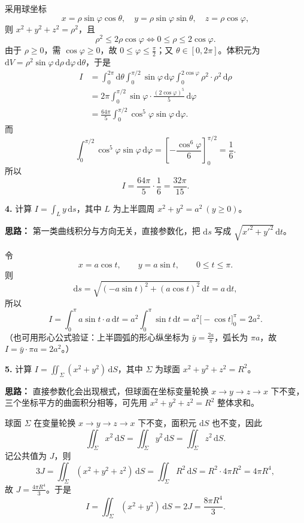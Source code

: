 采用球坐标
\[
x=\rho\sin\varphi\cos\theta,\quad
y=\rho\sin\varphi\sin\theta,\quad
z=\rho\cos\varphi,
\]
则 $x^2+y^2+z^2=\rho^2$，且
\[
\rho^2\le 2\rho\cos\varphi
\iff 0\le\rho\le 2\cos\varphi.
\]
由于 $\rho\ge0$，需 $\cos\varphi\ge0$，故 $0\le\varphi\le\frac{\pi}{2}$；又 $\theta\in[0,2\pi]$。体积元为 $\mathrm{d}V=\rho^2\sin\varphi\,\mathrm{d}\rho\,\mathrm{d}\varphi\,\mathrm{d}\theta$，于是
\[
\begin{aligned}
I
&=\int_0^{2\pi}\mathrm{d}\theta\int_0^{\pi/2}\sin\varphi\,\mathrm{d}\varphi
\int_0^{2\cos\varphi}\rho^2\cdot\rho^2\,\mathrm{d}\rho\\
&=2\pi\int_0^{\pi/2}\sin\varphi\cdot
\frac{(2\cos\varphi)^5}{5}\,\mathrm{d}\varphi\\
&=\frac{64\pi}{5}\int_0^{\pi/2}\cos^5\varphi\sin\varphi\,\mathrm{d}\varphi.
\end{aligned}
\]
而
\[
\int_0^{\pi/2}\cos^5\varphi\sin\varphi\,\mathrm{d}\varphi
=\left[-\frac{\cos^6\varphi}{6}\right]_0^{\pi/2}
=\frac16.
\]
所以
\[
I=\frac{64\pi}{5}\cdot\frac16=\frac{32\pi}{15}.
\]

\else \answerarea[10] \fi%

\textbf{4.} 计算 $\displaystyle I=\int_L y\,\mathrm{d}s$，其中 $L$ 为上半圆周 $x^2+y^2=a^2\ (y\ge0)$。

\ifshowsolutions%
\textbf{思路：} 第一类曲线积分与方向无关，直接参数化，把 $\mathrm{d}s$ 写成 $\sqrt{x'^2+y'^2}\,\mathrm{d}t$。

令
\[
x=a\cos t,\qquad y=a\sin t,\qquad 0\le t\le\pi.
\]
则
\[
\mathrm{d}s=\sqrt{(-a\sin t)^2+(a\cos t)^2}\,\mathrm{d}t=a\,\mathrm{d}t,
\]
所以
\[
I=\int_0^\pi a\sin t\cdot a\,\mathrm{d}t
=a^2\int_0^\pi\sin t\,\mathrm{d}t
=a^2\bigl[-\cos t\bigr]_0^\pi=2a^2.
\]
（也可用形心公式验证：上半圆弧的形心纵坐标为 $\bar y=\frac{2a}{\pi}$，弧长为 $\pi a$，故 $I=\bar y\cdot\pi a=2a^2$。）


\else \answerarea[8] \fi%

\textbf{5.} 计算 $\displaystyle I=\iint_\Sigma (x^2+y^2)\,\mathrm{d}S$，其中 $\Sigma$ 为球面 $x^2+y^2+z^2=R^2$。

\ifshowsolutions%
\textbf{思路：} 直接参数化会出现根式，但球面在坐标变量轮换 $x\to y\to z\to x$ 下不变，三个坐标平方的曲面积分相等，可先用 $x^2+y^2+z^2=R^2$ 整体求和。

球面 $\Sigma$ 在变量轮换 $x\to y\to z\to x$ 下不变，面积元 $\mathrm{d}S$ 也不变，因此
\[
\iint_\Sigma x^2\,\mathrm{d}S
=\iint_\Sigma y^2\,\mathrm{d}S
=\iint_\Sigma z^2\,\mathrm{d}S.
\]
记公共值为 $J$，则
\[
3J=\iint_\Sigma (x^2+y^2+z^2)\,\mathrm{d}S
=\iint_\Sigma R^2\,\mathrm{d}S
=R^2\cdot 4\pi R^2=4\pi R^4,
\]
故 $J=\frac{4\pi R^4}{3}$。于是
\[
I=\iint_\Sigma (x^2+y^2)\,\mathrm{d}S
=2J=\frac{8\pi R^4}{3}.
\]

